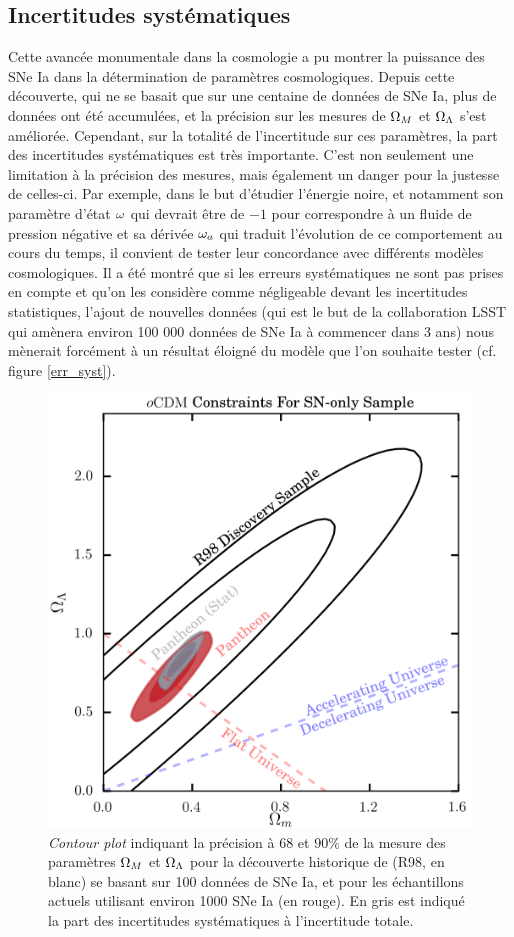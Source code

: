 \documentclass[a4paper, 12pt, svgnames]{article}
\begin{document}
\subsection{Incertitudes systématiques}\label{ssc:syst}
Cette avancée monumentale dans la cosmologie a pu montrer la puissance des SNe
Ia dans la détermination de paramètres cosmologiques. Depuis cette découverte,
qui ne se basait que sur une centaine de données de SNe Ia, plus de données ont
été accumulées, et la précision sur les mesures de $\Omega_M$ et $\Omega_\Lambda$ s'est
améliorée. Cependant, sur la totalité de l'incertitude sur ces paramètres, la
part des incertitudes systématiques est très importante. C'est non seulement une
limitation à la précision des mesures, mais également un danger pour la justesse
de celles-ci. Par exemple, dans le but d’étudier l’énergie noire, et notamment
son paramètre d’état $\omega$ qui devrait être de $-1$ pour correspondre à un fluide
de pression négative et sa dérivée $\omega_a$ qui traduit l’évolution de ce
comportement au cours du temps, il convient de tester leur concordance avec
différents modèles cosmologiques. Il a été montré que si les erreurs
systématiques ne sont pas prises en compte et qu'on les considère comme
négligeable devant les incertitudes statistiques, l'ajout de nouvelles données
(qui est le but de la collaboration LSST qui amènera environ 100 000 données de
SNe Ia à commencer dans 3 ans) nous mènerait forcément à un résultat éloigné du
modèle que l'on souhaite tester (cf. figure \ref{err_syst}).

\begin{figure}[htbp!]
    \centering
    \includegraphics[width=.5\linewidth]{Rapport_figures/scolnic_syst.png}
    \captionsetup{justification=centering}
    \caption{\textit{Contour plot} indiquant la précision à 68 et 90\% de la
    mesure des paramètres $\Omega_M$ et $\Omega_\Lambda$ pour la découverte historique de
     (R98, en blanc) se basant sur 100 données de SNe Ia, et
    pour les échantillons actuels utilisant environ 1000 SNe Ia (en rouge). En
    gris est indiqué la part des incertitudes systématiques à l'incertitude
    totale. \cite{scolnic_complete_2018}}
    \label{scolnic_syst}
\end{figure}
\end{document}
